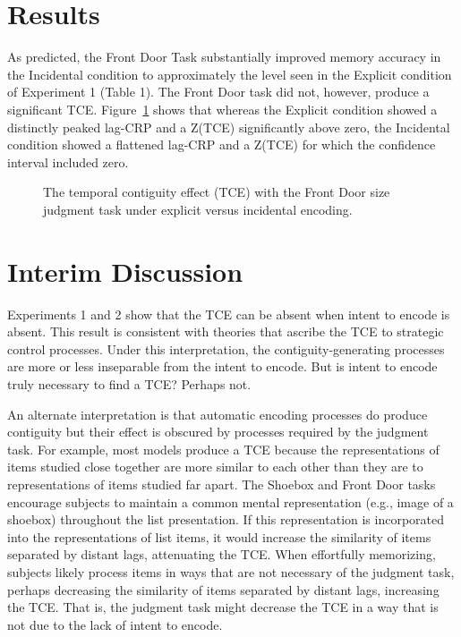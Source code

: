 \documentclass[man,natbib,floatsintext]{apa6} %
\begin{document}
\section{Results}
As predicted, the Front Door Task substantially improved memory accuracy in the Incidental condition to approximately the level seen in the Explicit condition of Experiment 1 (Table 1). The Front Door task did not, however, produce a significant TCE. Figure~\ref{door} shows that whereas the Explicit condition showed a distinctly peaked lag-CRP and a Z(TCE) significantly above zero, the Incidental condition showed a flattened lag-CRP and a Z(TCE) for which the confidence interval included zero.

\begin{figure}%
\caption{The temporal contiguity effect (TCE) with the Front Door size judgment task under explicit versus incidental encoding. \paneltext}
\label{door}
\end{figure}

\section{Interim Discussion}
Experiments 1 and 2 show that the TCE can be absent when intent to encode is absent. This result is consistent with theories that ascribe the TCE to strategic control processes. Under this interpretation, the contiguity-generating processes are more or less inseparable from the intent to encode. But is intent to encode truly necessary to find a TCE? Perhaps not.

An alternate interpretation is that automatic encoding processes do produce contiguity but their effect is obscured by processes required by the judgment task. For example, most models produce a TCE because the representations of items studied close together are more similar to each other than they are to representations of items studied far apart. The Shoebox and Front Door tasks encourage subjects to maintain a common mental representation (e.g., image of a shoebox) throughout the list presentation. If this representation is incorporated into the representations of list items, it would increase the similarity of items separated by distant lags, attenuating the TCE. When effortfully memorizing, subjects likely process items in ways that are not necessary of the judgment task, perhaps decreasing the similarity of items separated by distant lags, increasing the TCE. That is, the judgment task might decrease the TCE in a way that is not due to the lack of intent to encode.
\end{document}
